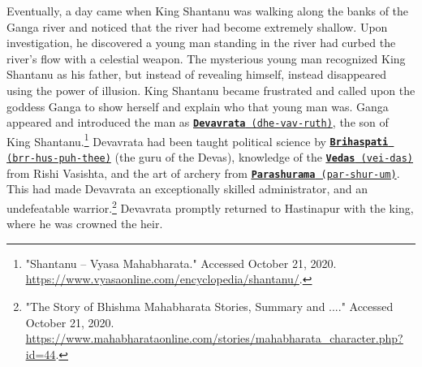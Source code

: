 \documentclass[10pt, letterpaper]{article}
\begin{document}
Eventually, a day came when King Shantanu was walking along the banks of
the Ganga river and noticed that the river had become extremely shallow.
Upon investigation, he discovered a young man standing in the river had
curbed the river's flow with a celestial weapon. The mysterious young
man recognized King Shantanu as his father, but instead of revealing
himself, instead disappeared using the power of illusion. King Shantanu
became frustrated and called upon the goddess Ganga to show herself and
explain who that young man was. Ganga appeared and introduced the man as
\texttt{\underline{\href{https://drive.google.com/file/d/1lthKwUjTzzscUKL2tPOHrR0aAlfg_nEK/view?usp=sharing}{\textbf{Devavrata}}
(dhe-vav-ruth)}}, the son of King Shantanu.\footnote{"Shantanu -- Vyasa
  Mahabharata." Accessed October 21, 2020.
  \href{https://www.vyasaonline.com/encyclopedia/shantanu/}{\underline{https://www.vyasaonline.com/encyclopedia/shantanu/}}.}
Devavrata had been taught political science by
\texttt{\underline{\href{https://drive.google.com/file/d/16Y6YUMikUEdmvmnieq0pjAi7FS8k6I7y/view?usp=sharing}{\textbf{Brihaspati}}
(brr-hus-puh-thee)}} (the guru of the Devas), knowledge of the
\texttt{\underline{\href{https://drive.google.com/file/d/1MTPm3EmU8PGgq2TPG95CLzbzy9gKVEDp/view?usp=sharing}{\textbf{Vedas}}
(vei-das)}} from Rishi Vasishta, and the art of archery from
\texttt{\underline{\href{https://drive.google.com/file/d/12Z_FvoFpsOF0ywvrrW5biNcu2Fkl8-qE/view?usp=sharing}{\textbf{Parashurama}}
(par-shur-um)}}. This had made Devavrata an exceptionally skilled
administrator, and an undefeatable warrior.\footnote{"The Story of
  Bhishma \textbar{} Mahabharata Stories, Summary and ...." Accessed
  October 21, 2020.
  \href{https://www.mahabharataonline.com/stories/mahabharata_character.php?id=44}{\underline{https://www.mahabharataonline.com/stories/mahabharata\_character.php?id=44}}.}
Devavrata promptly returned to Hastinapur with the king, where he was
crowned the heir. \\
\end{document}
